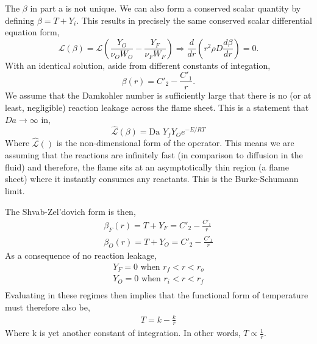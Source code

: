 \documentclass{article}
\begin{document}
The $\beta$ in part a is not unique. We can also form a conserved scalar
quantity by defining $\beta = T + Y_i$. This results in precisely the
same conserved scalar differential equation form, 
\begin{equation*}
\mathcal{L}\left(\beta \right) = \mathcal{L}\left( \frac{Y_O}{\nu_O W_O}
	    - \frac{Y_F}{\nu_F W_F} \right) \Rightarrow \frac{d}{dr}\left( r^2
	    \rho D \frac{d \beta}{dr}\right) = 0 .
\end{equation*}
With an identical solution, aside from different constants of
integation,
\begin{equation*}
\beta(r) = C'_2 - \frac{C'_1}{ r }.
\end{equation*}
We assume that the Damkohler number is sufficiently large that there is
no (or at least, negligible) reaction leakage across the flame
sheet. This is a statement that $Da \rightarrow \infty$ in, 
\begin{equation*}
 \mathcal{\hat L}\left(\beta \right) = \text{Da } Y_f Y_O e^{-E/RT}
\end{equation*}
Where $\mathcal{\hat L}\left( \right)$ is the non-dimensional form of
the operator. This means we are assuming that the reactions are
infinitely fast (in comparison to diffusion in the fluid) and therefore,
the flame sits at an asymptotically thin region (a flame sheet) where it instantly
consumes any reactants. This is the Burke-Schumann limit.

The Shvab-Zel'dovich form is then,
\begin{eqnarray*}
 \beta_F(r) = T + Y_F = C'_2 - \frac{C'_1}{ r } \\
 \beta_O(r) = T + Y_O = C'_2 - \frac{C'_1}{ r }
\end{eqnarray*}
As a consequence of no reaction leakage, 
\begin{eqnarray*}
 Y_F = 0 \text{ when } r_f < r < r_o \\
 Y_O = 0 \text{ when } r_i < r < r_f \\
\end{eqnarray*}
Evaluating in these regimes then implies that the functional form of
temperature must therefore also be,  
\begin{eqnarray*}
 T = k - \frac{k}{ r } 
\end{eqnarray*}
Where k is yet another constant of integration. In other words, $T
\propto \frac{1}{r} $.  

\newpage
\end{document}
